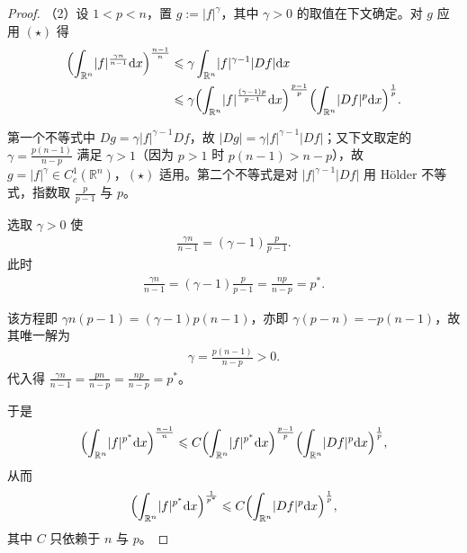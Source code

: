 \documentclass[../../main.tex]{subfiles}%
\begin{document}
\begin{proof}
（2）设 $1<p<n$，置 $g:=\lvert f\rvert^{\gamma}$，其中 $\gamma>0$ 的取值在下文确定。对 $g$ 应用 $(\star)$ 得
\begin{align*}
\Bigl(\int_{\mathbb{R}^n}\lvert f\rvert^{\frac{\gamma n}{n-1}}\mathrm{d} x\Bigr)^{\frac{n-1}{n}}
&\leqslant\gamma\int_{\mathbb{R}^n}\lvert f\rvert^{\gamma-1}\lvert Df\rvert\mathrm{d} x\\
&\leqslant\gamma\Bigl(\int_{\mathbb{R}^n}\lvert f\rvert^{\frac{(\gamma-1)p}{p-1}}\mathrm{d} x\Bigr)^{\frac{p-1}{p}}\Bigl(\int_{\mathbb{R}^n}\lvert Df\rvert^p\mathrm{d} x\Bigr)^{\frac{1}{p}}.
\end{align*}

第一个不等式中 $Dg=\gamma\lvert f\rvert^{\gamma-1}Df$，故 $\lvert Dg\rvert=\gamma\lvert f\rvert^{\gamma-1}\lvert Df\rvert$；又下文取定的 $\gamma=\frac{p(n-1)}{n-p}$ 满足 $\gamma>1$（因为 $p>1$ 时 $p(n-1)>n-p$），故 $g=\lvert f\rvert^{\gamma}\in C_c^1(\mathbb{R}^n)$，$(\star)$ 适用。第二个不等式是对 $\lvert f\rvert^{\gamma-1}\lvert Df\rvert$ 用 Hölder 不等式，指数取 $\frac{p}{p-1}$ 与 $p$。

选取 $\gamma>0$ 使
\begin{align*}
\frac{\gamma n}{n-1}=(\gamma-1)\frac{p}{p-1}.
\end{align*}
此时
\begin{align*}
\frac{\gamma n}{n-1}=(\gamma-1)\frac{p}{p-1}=\frac{np}{n-p}=p^*.
\end{align*}

该方程即 $\gamma n(p-1)=(\gamma-1)p(n-1)$，亦即 $\gamma(p-n)=-p(n-1)$，故其唯一解为
\begin{align*}
\gamma=\frac{p(n-1)}{n-p}>0 .
\end{align*}
代入得 $\frac{\gamma n}{n-1}=\frac{pn}{n-p}=\frac{np}{n-p}=p^*$。

于是
\begin{align*}
\Bigl(\int_{\mathbb{R}^n}\lvert f\rvert^{p^*}\mathrm{d} x\Bigr)^{\frac{n-1}{n}}
\leqslant C\Bigl(\int_{\mathbb{R}^n}\lvert f\rvert^{p^*}\mathrm{d} x\Bigr)^{\frac{p-1}{p}}\Bigl(\int_{\mathbb{R}^n}\lvert Df\rvert^p\mathrm{d} x\Bigr)^{\frac{1}{p}},
\end{align*}
从而
\begin{align*}
\Bigl(\int_{\mathbb{R}^n}\lvert f\rvert^{p^*}\mathrm{d} x\Bigr)^{\frac{1}{p^*}}
\leqslant C\Bigl(\int_{\mathbb{R}^n}\lvert Df\rvert^p\mathrm{d} x\Bigr)^{\frac{1}{p}},
\end{align*}
其中 $C$ 只依赖于 $n$ 与 $p$。
\end{proof}
\end{document}
